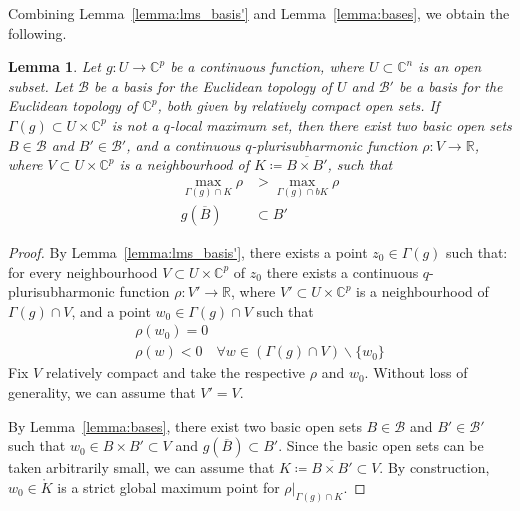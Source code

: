 \documentclass[reqno,oneside]{amsart}
\newcommand{\numberset}{\mathbb}
\newcommand{\R}{\numberset{R}}
\newcommand{\C}{\numberset{C}}
\theoremstyle{definition}
\theoremstyle{plain}
\newtheorem{lemma}[definition]{Lemma}
\theoremstyle{remark}
\begin{document}
Combining Lemma~\ref{lemma:lms_basis'} and Lemma~\ref{lemma:bases}, we obtain the following.
\begin{lemma}
\label{lemma:lms_basis2}
	Let $g:U\to\C^p$ be a continuous function, where $U\subset\C^n$ is an open subset. Let $\mathcal{B}$ be a basis for the Euclidean topology of $U$ and $\mathcal{B}'$ be a basis for the Euclidean topology of $\C^p$, both given by relatively compact open sets. If $\Gamma(g)\subset U\times\C^p$ is not a $q$-local maximum set, then there exist two basic open sets $B\in\mathcal{B}$ and $B'\in\mathcal{B}'$, and a continuous $q$-plurisubharmonic function $\rho:V\to\R$, where $V\subset U\times\C^p$ is a neighbourhood of $K\coloneqq\overline{B\times B'}$, such that
	\begin{align*}
		\max_{\Gamma(g)\cap K} \rho &> \max_{\Gamma(g)\cap bK} \rho \\
		g(\overline{B}) &\subset B'
	\end{align*}
\end{lemma}
\begin{proof}
	By Lemma~\ref{lemma:lms_basis'}, there exists a point $z_0\in\Gamma(g)$ such that: for every neighbourhood $V\subset U\times\C^p$ of $z_0$ there exists a continuous $q$-plurisubharmonic function $\rho:V'\to\R$, where $V'\subset U\times\C^p$ is a neighbourhood of $\Gamma(g)\cap V$, and a point $w_0\in\Gamma(g)\cap V$ such that
	\begin{gather*}
		\rho(w_0)=0 \\
		\rho(w)<0 \quad \forall w\in (\Gamma(g)\cap V)\smallsetminus\{w_0\}
	\end{gather*}
	Fix $V$ relatively compact and take the respective $\rho$ and $w_0$. Without loss of generality, we can assume that $V'=V$.
	
	By Lemma~\ref{lemma:bases}, there exist two basic open sets $B\in\mathcal{B}$ and $B'\in\mathcal{B}'$ such that $w_0\in B\times B'\subset V$ and $g(\overline{B})\subset B'$. Since the basic open sets can be taken arbitrarily small, we can assume that $K\coloneqq\overline{B\times B'}\subset V$. By construction, $w_0\in\mathring{K}$ is a strict global maximum point for $\rho|_{\Gamma(g)\cap K}$.
\end{proof}
\end{document}
